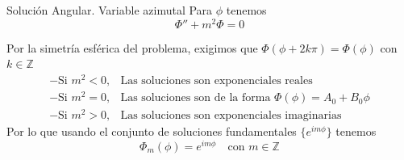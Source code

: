 \begin{frame}{Solución Angular. Variable azimutal}
	Para $\phi$ tenemos
	\[
		\Phi'' + m^2 \Phi = 0
	\]

	Por la simetría esférica del problema, exigimos que $\Phi(\phi + 2k\pi) = \Phi(\phi)$ con $k\in\mathbb{Z}$ 
	\[
		\begin{array}{ll}
			- \text{Si } m^2 < 0, & \text{Las soluciones son exponenciales reales}\\
			- \text{Si } m^2 = 0, & \text{Las soluciones son de la forma } \Phi(\phi) = A_0 + B_0\phi \\
			- \text{Si } m^2 > 0, & \text{Las soluciones son exponenciales imaginarias }
		\end{array}
	\]
	Por lo que usando el conjunto de soluciones fundamentales $\{e^{im\phi}\}$ tenemos
	\begin{equation}
		\Phi_m(\phi) = e^{im\phi} \quad \text{con } m\in\mathbb{Z}
		\label{eq:solución general azimutal}
	\end{equation}
\end{frame}
